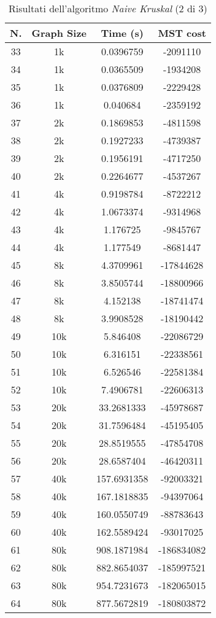 \begin{table}[H]
	\centering
	\begin{tabular}{|c|c|c|c|}
		\hline
		\textbf{N.} & \textbf{Graph Size} & \textbf{Time (s)} & \textbf{MST cost}\\
		\hline
		33 & 1k & 0.0396759 & -2091110\\
		\hline
		34 & 1k & 0.0365509 & -1934208\\
		\hline
		35 & 1k & 0.0376809 & -2229428\\
		\hline
		36 & 1k & 0.040684 & -2359192\\
		\hline\hline
		37 & 2k & 0.1869853 & -4811598\\
		\hline
		38 & 2k & 0.1927233 & -4739387\\
		\hline
		39 & 2k & 0.1956191 & -4717250\\
		\hline
		40 & 2k & 0.2264677 & -4537267\\
		\hline\hline
		41 & 4k & 0.9198784 & -8722212\\
		\hline
		42 & 4k & 1.0673374 & -9314968\\
		\hline
		43 & 4k & 1.176725 & -9845767\\
		\hline
		44 & 4k & 1.177549 & -8681447\\
		\hline\hline
		45 & 8k & 4.3709961 & -17844628\\
		\hline
		46 & 8k & 3.8505744 & -18800966\\
		\hline
		47 & 8k & 4.152138 & -18741474\\
		\hline
		48 & 8k & 3.9908528 & -18190442\\
		\hline\hline
		49 & 10k & 5.846408 & -22086729\\
		\hline
		50 & 10k & 6.316151 & -22338561\\
		\hline
		51 & 10k & 6.526546 & -22581384\\
		\hline
		52 & 10k & 7.4906781 & -22606313\\
		\hline\hline
		53 & 20k & 33.2681333 & -45978687\\
		\hline
		54 & 20k & 31.7596484 & -45195405\\
		\hline
		55 & 20k & 28.8519555 & -47854708\\
		\hline
		56 & 20k & 28.6587404 & -46420311\\
		\hline\hline
		57 & 40k & 157.6931358 & -92003321\\
		\hline
		58 & 40k & 167.1818835 & -94397064\\
		\hline
		59 & 40k & 160.0550749 & -88783643\\
		\hline
		60 & 40k & 162.5589424 & -93017025\\
		\hline\hline
		61 & 80k & 908.1871984 & -186834082\\
		\hline
		62 & 80k & 882.8654037 & -185997521\\
		\hline
		63 & 80k & 954.7231673 & -182065015\\
		\hline
		64 & 80k & 877.5672819 & -180803872\\
		\hline
	\end{tabular}
\caption{Risultati dell'algoritmo \textit{Naive Kruskal} (2 di 3)}
\end{table}

